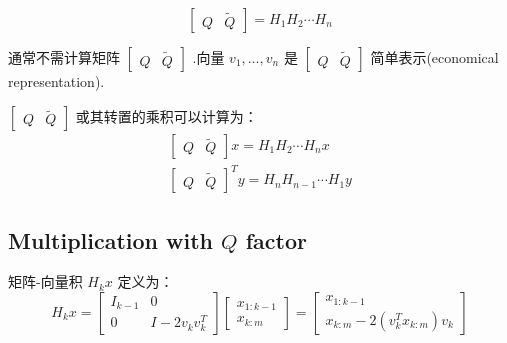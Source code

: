 \begin{definition}
   \begin{equation}
\left[\begin{array}{ll}
Q & \tilde{Q}
\end{array}\right]=H_{1} H_{2} \cdots H_{n}
\end{equation} 
\end{definition}

通常不需计算矩阵 $ \left[\begin{array}{ll}Q & \tilde{Q}\end{array}\right] $ .向量 $ v_{1}, \ldots, v_{n} $ 是 $ \left[\begin{array}{ll}Q & \tilde{Q}\end{array}\right] $ 简单表示(economical representation).

\begin{theorem}
    $ \left[\begin{array}{ll}Q & \tilde{Q}\end{array}\right] $ 或其转置的乘积可以计算为：
\begin{equation}
\begin{array}{c}
{\left[\begin{array}{cc}
Q & \tilde{Q}
\end{array}\right] x=H_{1} H_{2} \cdots H_{n} x} \\
{\left[\begin{array}{ll}
Q & \tilde{Q}
\end{array}\right]^{T} y=H_{n} H_{n-1} \cdots H_{1} y}
\end{array}
\end{equation}
\end{theorem}

\subsection{Multiplication with $Q$ factor}

\begin{definition}[矩阵-向量积 $ H_{k} x $]
    矩阵-向量积 $ H_{k} x $ 定义为：
\begin{equation}
H_{k} x=\left[\begin{array}{cc}
I_{k-1} & 0 \\
0 & I-2 v_{k} v_{k}^{T}
\end{array}\right]\left[\begin{array}{c}
x_{1: k-1} \\
x_{k: m}
\end{array}\right]=\left[\begin{array}{c}
x_{1: k-1} \\
x_{k: m}-2\left(v_{k}^{T} x_{k: m}\right) v_{k}
\end{array}\right]
\end{equation}
\end{definition}

